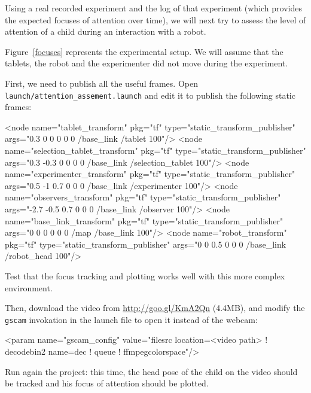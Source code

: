 \documentclass{instructions}
\begin{document}
Using a real recorded experiment and the log of that experiment (which provides
the expected focuses of attention over time), we will next try to assess the
level of attention of a child during an interaction with a robot.

Figure~\ref{focuses} represents the experimental setup. We will assume that the
tablets, the robot and the experimenter did not move during the experiment.

First, we need to publish all the useful frames. Open {\tt
launch/attention\_assement.launch} and edit it to publish the following static
frames:

\begin{xmlcode}
<node name="tablet_transform" pkg="tf" type="static_transform_publisher" 
                                                args="0.3 0 0 0 0 0 /base_link /tablet 100"/>
<node name="selection_tablet_transform" pkg="tf" type="static_transform_publisher"
                                   args="0.3 -0.3 0 0 0 0 /base_link /selection_tablet 100"/>
<node name="experimenter_transform" pkg="tf" type="static_transform_publisher"
                                       args="0.5 -1 0.7 0 0 0 /base_link /experimenter 100"/>
<node name="observers_transform" pkg="tf" type="static_transform_publisher"
                                        args="-2.7 -0.5 0.7 0 0 0 /base_link /observer 100"/>
<node name="base_link_transform" pkg="tf" type="static_transform_publisher"
                                                     args="0 0 0 0 0 0 /map /base_link 100"/>
<node name="robot_transform" pkg="tf" type="static_transform_publisher" 
                                            args="0 0 0.5 0 0 0 /base_link /robot_head 100"/>
\end{xmlcode}

Test that the focus tracking and plotting works well with this more complex
environment.

Then, download the video from \url{http://goo.gl/KmA2Qn} (4.4MB), and modify the {\tt gscam}
invokation in the launch file to open it instead of the webcam:

\begin{xmlcode}
    <param name="gscam_config"
      value="filesrc location=<video path> ! decodebin2 name=dec ! queue ! ffmpegcolorspace"/>
\end{xmlcode}

Run again the project: this time, the head pose of the child on the video should
be tracked and his focus of attention should be plotted.
\end{document}
